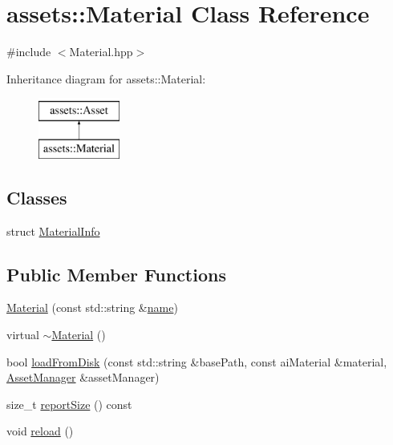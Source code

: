 \hypertarget{classassets_1_1Material}{\section{assets\-:\-:Material Class Reference}
\label{classassets_1_1Material}
}


{\ttfamily \#include $<$Material.\-hpp$>$}

Inheritance diagram for assets\-:\-:Material\-:\begin{figure}[H]
\begin{center}
\leavevmode
\includegraphics[height=2.000000cm]{classassets_1_1Material}
\end{center}
\end{figure}
\subsection*{Classes}
\begin{DoxyCompactItemize}
\item 
struct \hyperlink{structassets_1_1Material_1_1MaterialInfo}{Material\-Info}
\end{DoxyCompactItemize}
\subsection*{Public Member Functions}
\begin{DoxyCompactItemize}
\item 
\hyperlink{classassets_1_1Material_a4dc8016296adc30a7b98350bdab680de}{Material} (const std\-::string \&\hyperlink{classassets_1_1Asset_a57fe90e1aa9281f2dd59041dffcc74b4}{name})
\item 
virtual \hyperlink{classassets_1_1Material_af56b51e9bf248285908d10fab99b8af6}{$\sim$\-Material} ()
\item 
bool \hyperlink{classassets_1_1Material_a1cdbb1a9cb013ac126c2fc880a36a694}{load\-From\-Disk} (const std\-::string \&base\-Path, const ai\-Material \&material, \hyperlink{classassets_1_1AssetManager}{Asset\-Manager} \&asset\-Manager)
\item 
size\-\_\-t \hyperlink{classassets_1_1Material_a3aef13c20019d025b6df9d3032041e69}{report\-Size} () const 
\item 
void \hyperlink{classassets_1_1Material_a311d20ba149f65238fa225b75b5c1a88}{reload} ()
\end{DoxyCompactItemize}
